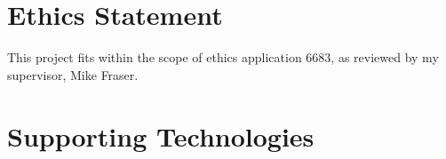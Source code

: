 \documentclass[ oneside,%
                    author={Jack Jarvis},
                    degree={BSc},
                     title={FlexIR: Flexible PCB Wristbands for Infrared Based Gesture Recognition},
                    unit={COMS30045},
                    subtitle={Investigating the Effect of LED Viewing Angle on Gesture Classification in Infrared Sensing Systems}]{dissertation}
\begin{document}


\tableofcontents
\listoffigures
\listoftables




\chapter*{Ethics Statement}

This project fits within the scope of ethics application 6683, as reviewed by my supervisor, Mike Fraser.


\chapter*{Supporting Technologies}
\end{document}
